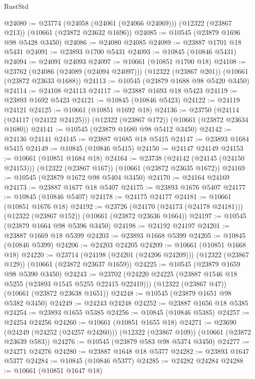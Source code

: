 \begin{lexlean}{RustStd}
\begin{coremodule}
@24080 := @23774
    (@24058 (@24061 (@24066 @24069)))
    (@12322 (@23867 @213))
    (@10661 (@23872 @23632 @1696))
@24085 := @10545 (@23879 @1696 @98 @5428 @3450)
@24086 := @24080 @24085
@24089 := @23887 @1701 @18 @5431
@24091 := @23893 @1700 @5431
@24093 := @10845 (@10846 @5431)
@24094 := @24091 @24093
@24097 := @10661 (@10851 @1700 @18)
@24108 := @23762
    (@24086 (@24089 (@24094 @24097)))
    (@12322 (@23867 @201))
    (@10661 (@23872 @23633 @1688))
@24113 := @10545 (@23879 @1688 @98 @5420 @3450)
@24114 := @24108 @24113
@24117 := @23887 @1693 @18 @5423
@24119 := @23893 @1692 @5423
@24121 := @10845 (@10846 @5423)
@24122 := @24119 @24121
@24125 := @10661 (@10851 @1692 @18)
@24136 := @23750
    (@24114 (@24117 (@24122 @24125)))
    (@12322 (@23867 @172))
    (@10661 (@23872 @23634 @1680))
@24141 := @10545 (@23879 @1680 @98 @5412 @3450)
@24142 := @24136 @24141
@24145 := @23887 @1685 @18 @5415
@24147 := @23893 @1684 @5415
@24149 := @10845 (@10846 @5415)
@24150 := @24147 @24149
@24153 := @10661 (@10851 @1684 @18)
@24164 := @23738
    (@24142 (@24145 (@24150 @24153)))
    (@12322 (@23867 @167))
    (@10661 (@23872 @23635 @1672))
@24169 := @10545 (@23879 @1672 @98 @5404 @3450)
@24170 := @24164 @24169
@24173 := @23887 @1677 @18 @5407
@24175 := @23893 @1676 @5407
@24177 := @10845 (@10846 @5407)
@24178 := @24175 @24177
@24181 := @10661 (@10851 @1676 @18)
@24192 := @23726
    (@24170 (@24173 (@24178 @24181)))
    (@12322 (@23867 @152))
    (@10661 (@23872 @23636 @1664))
@24197 := @10545 (@23879 @1664 @98 @5396 @3450)
@24198 := @24192 @24197
@24201 := @23887 @1669 @18 @5399
@24203 := @23893 @1668 @5399
@24205 := @10845 (@10846 @5399)
@24206 := @24203 @24205
@24209 := @10661 (@10851 @1668 @18)
@24220 := @23714
    (@24198 (@24201 (@24206 @24209)))
    (@12322 (@23867 @129))
    (@10661 (@23872 @23637 @1659))
@24225 := @10545 (@23879 @1659 @98 @5390 @3450)
@24243 := @23702
    (@24220 @24225 (@23887 @1546 @18 @5255 (@23893 @1545 @5255 @22415 @22419)))
    (@12322 (@23867 @47))
    (@10661 (@23872 @23638 @1651))
@24248 := @10545 (@23879 @1651 @98 @5382 @3450)
@24249 := @24243 @24248
@24252 := @23887 @1656 @18 @5385
@24254 := @23893 @1655 @5385
@24256 := @10845 (@10846 @5385)
@24257 := @24254 @24256
@24260 := @10661 (@10851 @1655 @18)
@24271 := @23690
    (@24249 (@24252 (@24257 @24260)))
    (@12322 (@23867 @109))
    (@10661 (@23872 @23639 @583))
@24276 := @10545 (@23879 @583 @98 @5374 @3450)
@24277 := @24271 @24276
@24280 := @23887 @1648 @18 @5377
@24282 := @23893 @1647 @5377
@24284 := @10845 (@10846 @5377)
@24285 := @24282 @24284
@24288 := @10661 (@10851 @1647 @18)

\end{coremodule}
\end{lexlean}
